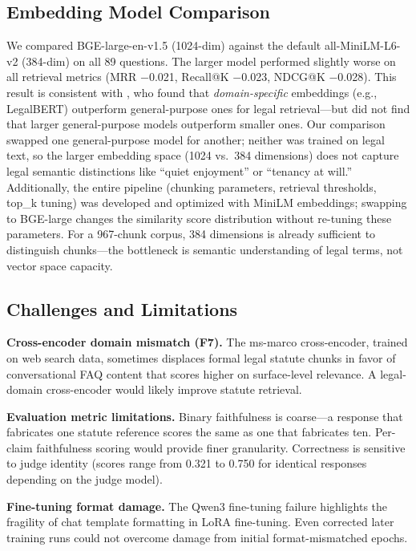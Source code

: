\documentclass{article}
\begin{document}
\subsection{Embedding Model Comparison}

We compared BGE-large-en-v1.5 (1024-dim) against the default all-MiniLM-L6-v2 (384-dim) on all 89 questions. The larger model performed slightly worse on all retrieval metrics (MRR $-$0.021, Recall@K $-$0.023, NDCG@K $-$0.028). This result is consistent with \citet{wiratunga2024cbrrag}, who found that \emph{domain-specific} embeddings (e.g., LegalBERT) outperform general-purpose ones for legal retrieval---but did not find that larger general-purpose models outperform smaller ones. Our comparison swapped one general-purpose model for another; neither was trained on legal text, so the larger embedding space (1024 vs.\ 384 dimensions) does not capture legal semantic distinctions like ``quiet enjoyment'' or ``tenancy at will.'' Additionally, the entire pipeline (chunking parameters, retrieval thresholds, top\_k tuning) was developed and optimized with MiniLM embeddings; swapping to BGE-large changes the similarity score distribution without re-tuning these parameters. For a 967-chunk corpus, 384 dimensions is already sufficient to distinguish chunks---the bottleneck is semantic understanding of legal terms, not vector space capacity.

\subsection{Challenges and Limitations}

\textbf{Cross-encoder domain mismatch (F7).} The ms-marco cross-encoder, trained on web search data, sometimes displaces formal legal statute chunks in favor of conversational FAQ content that scores higher on surface-level relevance. A legal-domain cross-encoder would likely improve statute retrieval.

\textbf{Evaluation metric limitations.} Binary faithfulness is coarse---a response that fabricates one statute reference scores the same as one that fabricates ten. Per-claim faithfulness scoring would provide finer granularity. Correctness is sensitive to judge identity (scores range from 0.321 to 0.750 for identical responses depending on the judge model).

\textbf{Fine-tuning format damage.} The Qwen3 fine-tuning failure highlights the fragility of chat template formatting in LoRA fine-tuning. Even corrected later training runs could not overcome damage from initial format-mismatched epochs.
\end{document}
